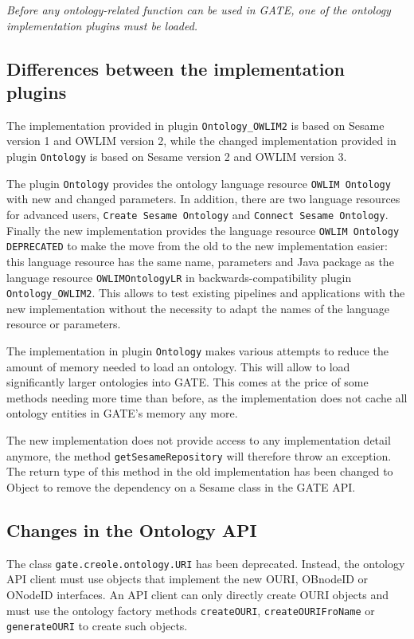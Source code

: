 {\emph{Before any ontology-related function can be used in GATE, one of the
ontology implementation plugins must be loaded.}


\subsection{Differences between the implementation plugins}

The implementation provided in plugin \texttt{Ontology\_OWLIM2} is based
on Sesame version 1 and OWLIM version 2, while the changed
implementation provided in plugin \texttt{Ontology} is based  on Sesame 
version 2 and OWLIM version 3. 

The plugin \texttt{Ontology} provides the ontology language resource
\texttt{OWLIM Ontology} with new and changed parameters. In addition,
there are two language resources for advanced users, 
\texttt{Create Sesame Ontology} and \texttt{Connect Sesame Ontology}.
Finally the new implementation provides the language resource
\texttt{OWLIM Ontology DEPRECATED} to make the move from the old to the
new implementation easier: this language resource has the same name, 
parameters and Java package as the language resource \texttt{OWLIMOntologyLR}
in backwards-compatibility plugin \texttt{Ontology\_OWLIM2}. This allows
to test existing pipelines and applications with the new implementation
without the necessity to adapt the names of the language resource or
parameters.

The implementation in plugin \texttt{Ontology} makes various attempts to
reduce the amount of memory needed to load an ontology. This will allow
to load significantly larger ontologies into GATE. This comes at the 
price of some methods needing more time than before, as the implementation
does not cache all ontology entities in GATE's memory any more. 

The new implementation does not provide access to any implementation 
detail anymore, the method \texttt{getSesameRepository} will therefore
throw an exception. The return type of this method in the old implementation
has been changed to Object to remove the dependency on a Sesame
class in the GATE API.

\subsection{Changes in the Ontology API}
The class \verb!gate.creole.ontology.URI! has been deprecated. Instead,
the ontology API client must use objects that implement the new
OURI, OBnodeID or ONodeID interfaces. An API client can only 
directly create OURI objects and must use the ontology factory 
methods \texttt{createOURI}, \texttt{createOURIFroName} or 
\texttt{generateOURI} to create such objects. 

}
